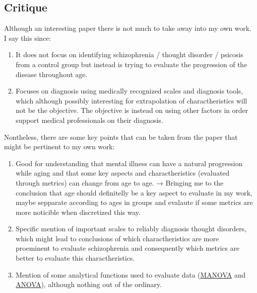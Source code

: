 \documentclass{Paper_Summary}
\begin{document}
\makepapertitle

\breakline

\begin{center}
    \section*{Critique}
\end{center}
    
    Although an interesting paper there is not much to take away into my own work. I say this since:
    \begin{enumerate}
        \item It does not focus on identifying schizophrenia / thought disorder / psicosis from a control group but instead is trying to evaluate the progression of the disease throughout age.
        \item Focuses on diagnosis using medically recognized scales and diagnosis tools, which although possibly interesting for extrapolation of charactheristics will not be the objective. The objective is instead on using other factors in order support medical professionals on their diagnosis.
    \end{enumerate}

    Nontheless, there are some key points that can be taken from the paper that might be pertinent to my own work:
    \begin{enumerate}
        \item Good for understanding that mental illness can have a natural progression while aging and that some key aspects and charactheristics (evaluated through metrics) can change from age to age. → Bringing me to the conclusion that age should definitelly be a key aspect to evaluate in my work, maybe sepparate according to ages in groups and evalaute if some metrics are more noticible when discretized this way.
        \item Specific mention of important scales to reliably diagnosis thought disorders, which might lead to conclusions of which charactheristics are more proeminent to evaluate schizophrenia and consequently which metrics are better to evaluate this charactheristics.
        \item Mention of some analytical functions used to evaluate data (\href{https://en.wikipedia.org/wiki/Multivariate_analysis_of_variance}{MANOVA} and \href{https://en.wikipedia.org/wiki/Analysis_of_variance}{ANOVA}), although nothing out of the ordinary.
    \end{enumerate}

\breakline
\end{document}
